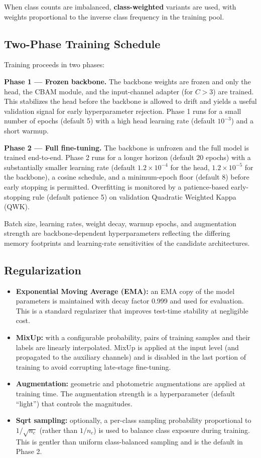 \documentclass[11pt]{article}
\begin{document}
When class counts are imbalanced, \textbf{class-weighted} variants are used, with weights proportional to the inverse class frequency in the training pool.

\subsection{Two-Phase Training Schedule}
Training proceeds in two phases:

\textbf{Phase 1 --- Frozen backbone.} The backbone weights are frozen and only the head, the CBAM module, and the input-channel adapter (for $C > 3$) are trained. This stabilizes the head before the backbone is allowed to drift and yields a useful validation signal for early hyperparameter rejection. Phase 1 runs for a small number of epochs (default 5) with a high head learning rate (default $10^{-3}$) and a short warmup.

\textbf{Phase 2 --- Full fine-tuning.} The backbone is unfrozen and the full model is trained end-to-end. Phase 2 runs for a longer horizon (default 20 epochs) with a substantially smaller learning rate (default $1.2 \times 10^{-4}$ for the head, $1.2 \times 10^{-5}$ for the backbone), a cosine schedule, and a minimum-epoch floor (default 8) before early stopping is permitted. Overfitting is monitored by a patience-based early-stopping rule (default patience 5) on validation Quadratic Weighted Kappa (QWK).

Batch size, learning rates, weight decay, warmup epochs, and augmentation strength are backbone-dependent hyperparameters reflecting the differing memory footprints and learning-rate sensitivities of the candidate architectures.

\subsection{Regularization}
\label{sec:augmentation}
\begin{itemize}[leftmargin=*, topsep=0pt]
  \item \textbf{Exponential Moving Average (EMA):} an EMA copy of the model parameters is maintained with decay factor 0.999 and used for evaluation. This is a standard regularizer that improves test-time stability at negligible cost.
  \item \textbf{MixUp:} with a configurable probability, pairs of training samples and their labels are linearly interpolated. MixUp is applied at the input level (and propagated to the auxiliary channels) and is disabled in the last portion of training to avoid corrupting late-stage fine-tuning.
  \item \textbf{Augmentation:} geometric and photometric augmentations are applied at training time. The augmentation strength is a hyperparameter (default ``light'') that controls the magnitudes.
  \item \textbf{Sqrt sampling:} optionally, a per-class sampling probability proportional to $1/\sqrt{n_c}$ (rather than $1/n_c$) is used to balance class exposure during training. This is gentler than uniform class-balanced sampling and is the default in Phase 2.
\end{itemize}
\end{document}
